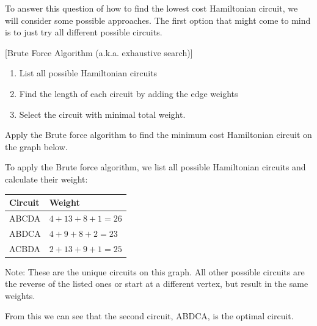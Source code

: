 To answer this question of how to find the lowest cost Hamiltonian circuit, we will consider some possible approaches.  The first option that might come to mind is to just try all different possible circuits.

\begin{algorithm}{}{}[Brute Force Algorithm (a.k.a. exhaustive search)]
\hspace{3in}
\begin{enumerate}
\item	List all possible Hamiltonian circuits
\item	Find the length of each circuit by adding the edge weights
\item	Select the circuit with minimal total weight.
\end{enumerate}
\end{algorithm}

\begin{example}{} %
Apply the Brute force algorithm to find the minimum cost Hamiltonian circuit on the graph below.\\

\begin{center}
\end{center}

To apply the Brute force algorithm, we list all possible Hamiltonian circuits and calculate their weight:
\begin{center}
\begin{tabular}{|l|l|}
\hline
Circuit & Weight\\
\hline 
ABCDA & $4+13+8+1=26$\\
\hline
ABDCA & $4+9+8+2=23$\\
\hline
ACBDA & $2+13+9+1=25$\\
\hline
\end{tabular}
\par{}\label{tab:graphtheory-dor1-tab05}%

\end{center}

Note:  These are the unique circuits on this graph.  All other possible circuits are the reverse of the listed ones or start at a different vertex, but result in the same weights.

From this we can see that the second circuit, ABDCA, is the optimal circuit.  
\end{example}

